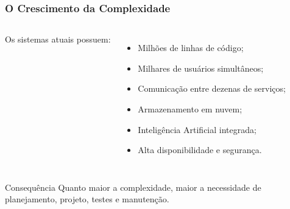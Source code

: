 \documentclass[9pt]{beamer}
\begin{document}
\begin{frame}
\frametitle{O Crescimento da Complexidade}

\begin{columns}[T]
Os sistemas atuais possuem:

\begin{itemize}
\item Milhões de linhas de código;
\item Milhares de usuários simultâneos;
\item Comunicação entre dezenas de serviços;
\item Armazenamento em nuvem;
\item Inteligência Artificial integrada;
\item Alta disponibilidade e segurança.
\end{itemize}

\begin{center}
\end{center}
\end{columns}

\vspace{0.25cm}
\begin{alertblock}{Consequência}
Quanto maior a complexidade, maior a necessidade de planejamento,
projeto, testes e manutenção.
\end{alertblock}

\end{frame}
\end{document}
